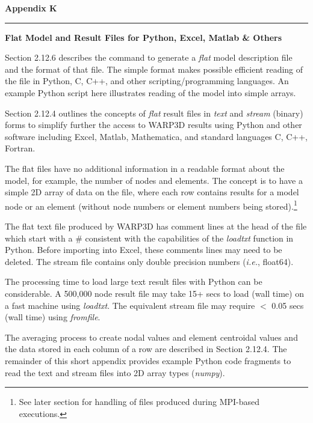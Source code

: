 \documentclass[10pt]{report}
\numberwithin{equation}{section}
\newcommand{\ie}{\ti{i.e.},\xspace}
\newcommand{\ti}{\emph}
\begin{document}
\LARGE
\hfill
\textbf{Appendix K}
\rule[0.15in]{450pt}{0.5mm}
\LARGE
\begin{flushright}
 \textbf{
{\selectfont Flat Model and Result Files for Python, Excel, Matlab \& Others}}
\end{flushright}
\normalsize
%
%
Section 2.12.6 describes the command to generate a \ti{flat} model description
file and the format of that file.  The simple format makes possible efficient
reading of the file in Python, C, C++, and other scripting/programming
languages. An example Python script here illustrates reading of the
model into simple arrays.


Section 2.12.4 outlines the concepts of  \ti{flat} result files in
\ti{text} and \ti{stream} (binary) forms to simplify further the access to WARP3D
results using Python and other software
including Excel, Matlab, Mathematica, and standard languages C, C++, Fortran.

The flat files have no additional information in a readable format about the
model, for example, the number of nodes and elements.
The concept is to have a simple 2D array of data on the file,
where each row contains results for a model node or an element (without
node numbers or element numbers being stored).\footnote{See later section for handling of 
files produced during MPI-based executions.}

The flat text file produced by WARP3D has comment lines at the head of the
file which start with a \# consistent
with the capabilities of the \ti{loadtxt} function in Python. Before importing into
Excel, these comments lines may need to be deleted.
The stream file contains only double precision numbers (\ie float64).

The processing time to load large text result files with Python can be considerable.
A 500,000  node result file may take 15+ secs to load (wall time) on a fast machine
using  \ti{loadtxt}. 
The equivalent stream file may require $<$ 0.05 secs (wall time) using
\ti{fromfile}.

The averaging process to create nodal values and element centroidal
values and the data stored in each column of a row  are
described in Section 2.12.4. The remainder of this short appendix provides
example Python code fragments to read the text and stream files
into 2D array types (\ti{numpy}).
%
%
\end{document}
